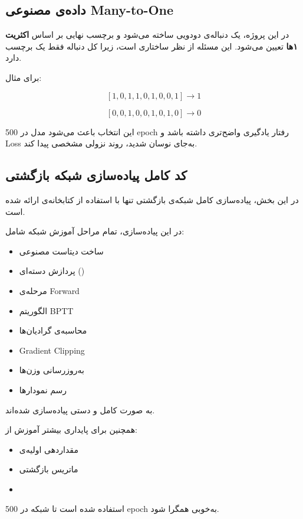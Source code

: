 \documentclass[12pt,a4paper]{article}
\begin{document}
\subsection{داده‌ی مصنوعی Many-to-One}

در این پروژه، یک دنباله‌ی دودویی ساخته می‌شود و برچسب نهایی بر اساس
\textbf{اکثریت ۱ها} تعیین می‌شود. این مسئله از نظر ساختاری 
است، زیرا کل دنباله فقط یک برچسب دارد.

برای مثال:

\[
[1,0,1,1,0,1,0,0,1] \rightarrow 1
\]

\[
[0,0,1,0,0,1,0,1,0] \rightarrow 0
\]

این انتخاب باعث می‌شود مدل در 500 epoch رفتار یادگیری واضح‌تری داشته باشد و
Loss به‌جای نوسان شدید، روند نزولی مشخصی پیدا کند.

\subsection{کد کامل پیاده‌سازی شبکه بازگشتی}

\begin{tcolorbox}[
	colback=lightblue,
	colframe=mainblue,
	title={توضیح کلی کد},
	fonttitle=\bfseries
	]
	
	در این بخش، پیاده‌سازی کامل شبکه‌ی بازگشتی 
	تنها با استفاده از کتابخانه‌ی  ارائه شده است.
	
	در این پیاده‌سازی، تمام مراحل آموزش شبکه شامل:
	\begin{itemize}
		\item ساخت دیتاست مصنوعی
		\item پردازش دسته‌ای ()
		\item مرحله‌ی Forward
		\item الگوریتم BPTT
		\item محاسبه‌ی گرادیان‌ها
		\item Gradient Clipping
		\item به‌روزرسانی وزن‌ها
		\item رسم نمودارها
	\end{itemize}
	
	به صورت کامل و دستی پیاده‌سازی شده‌اند.
	
	همچنین برای پایداری بیشتر آموزش از:
	\begin{itemize}
		\item مقداردهی اولیه‌ی 
		\item ماتریس بازگشتی 
		\item {}
	\end{itemize}
	
	استفاده شده است تا شبکه در 500 epoch به‌خوبی همگرا شود.
	
\end{tcolorbox}
\end{document}
